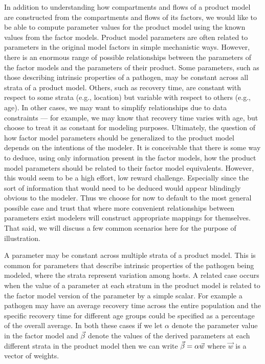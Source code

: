 In addition to understanding how compartments and flows of a product model are constructed from the compartments and flows of its factors, we would like to be able to compute parameter values for the product model using the known values from the factor models.
Product model parameters are often related to parameters in the original model factors in simple mechanistic ways. However, there is an enormous range of possible relationships between the parameters of the factor models and the parameters of their product.
Some parameters, such as those describing intrinsic properties of a pathogen, may be constant across all strata of a product model. Others, such as recovery time, are constant with respect to some strata (e.g., location) but variable with respect to others (e.g., age). In other cases, we may want to simplify relationships due to data constraints --- for example, we may know that recovery time varies with age, but choose to treat it as constant for modeling purposes. Ultimately, the question of how factor model parameters should be generalized to the product model depends on the intentions of the modeler. It is conceivable that there is some way to deduce, using only information present in the factor models, how the product model parameters should be related to their factor model equivalents. However, this would seem to be a high effort, low reward challenge. Especially since the sort of information that would need to be deduced would appear blindingly obvious to the modeler. Thus we choose for now to default to the most general possible case and trust that where more convenient relationships between parameters exist modelers will construct appropriate mappings for themselves. That said, we will discuss a few common scenarios here for the purpose of illustration. 

A parameter may be constant across multiple strata of a product model. This is common for parameters that describe intrinsic properties of the pathogen being modeled, where the strata represent variation among hosts. A related case occurs when the value of a parameter at each stratum in the product model is related to the factor model version of the parameter by a simple scalar. For example a pathogen may have an average recovery time across the entire population and the specific recovery time for different age groups could be specified as a percentage of the overall average. In both these cases if we let $\alpha$ denote the parameter value in the factor model and $\vec{\beta}$ denote the values of the derived parameters at each different strata in the product model then we can write $\vec{\beta} = \alpha\vec{w}$ where $\vec{w}$ is a vector of weights.

